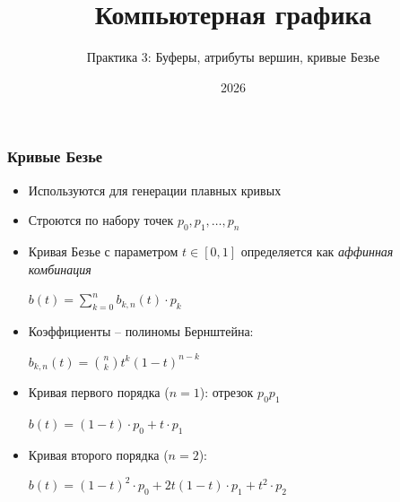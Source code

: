 \documentclass[10pt]{beamer}
\title{Компьютерная графика}
\subtitle{Практика 3: Буферы, атрибуты вершин, кривые Безье}
\date{2026}
\begin{document}
\frame{\titlepage}

\begin{frame}[fragile]
\frametitle{Кривые Безье}
\begin{itemize}
\item Используются для генерации плавных кривых
\pause
\item Строются по набору точек \begin{math}p_0, p_1, \dots, p_n\end{math}
\pause
\item Кривая Безье с параметром \begin{math}t \in [0, 1]\end{math} определяется как \textit{аффинная комбинация}

\begin{center}
\begin{math}
b(t) = \sum\limits_{k=0}^n b_{k,n}(t) \cdot p_k
\end{math}
\end{center}

\pause
\item Коэффициенты -- полиномы Бернштейна:

\begin{center}
\begin{math}
b_{k,n}(t) = \binom{n}{k}t^k(1-t)^{n-k}
\end{math}
\end{center}

\pause
\item Кривая первого порядка (\begin{math}n=1\end{math}): отрезок \begin{math}p_0 p_1\end{math}

\begin{center}
\begin{math}
b(t) = (1-t)\cdot p_0 + t \cdot p_1
\end{math}
\end{center}

\pause
\item Кривая второго порядка (\begin{math}n=2\end{math}):

\begin{center}
\begin{math}
b(t) = (1-t)^2 \cdot p_0 + 2t(1-t) \cdot p_1 + t^2 \cdot p_2
\end{math}
\end{center}

\end{itemize}
\end{frame}
\end{document}

